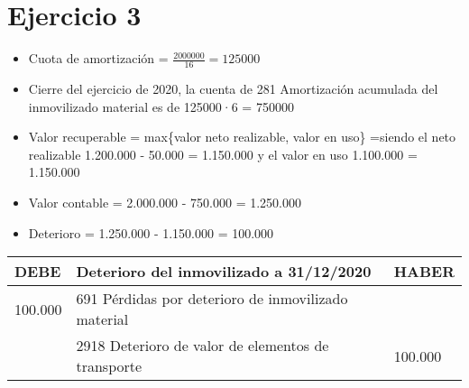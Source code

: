 \documentclass[a4paper,12pt]{article}
\newcommand{\fec}{31/12/}
\newcommand{\valorrecuperable}{Valor recuperable = max\{valor neto realizable, valor en uso\} =}
\newcommand{\PDI}{691 Pérdidas por deterioro de inmovilizado material}
\newcommand{\VC}{Valor contable = }
\begin{document}
\section{Ejercicio 3}

\begin{itemize}
    \item Cuota de amortización = $\frac{2000000}{16} = 125000$
    \item Cierre del ejercicio de 2020, la cuenta de 281 Amortización acumulada del inmovilizado material es de 125000·6 = 750000
    \item \valorrecuperable siendo el neto realizable 1.200.000 - 50.000 = 1.150.000 y el valor en uso 1.100.000 = 1.150.000
    \item \VC 2.000.000 - 750.000 = 1.250.000
    \item Deterioro = 1.250.000 - 1.150.000 = 100.000
\end{itemize}

\begin{table}[H]
    \centering
    \begin{tabular}{|p{3cm}|p{6cm}|p{3cm}|}
    \hline
    \textbf{DEBE} & \textbf{Deterioro del inmovilizado a \fec2020} & \textbf{HABER} \\
    \hline
    100.000& \PDI & \\
    \hline
    & 2918 Deterioro de valor de elementos de transporte & 100.000\\
    \hline
    \end{tabular}
\end{table}
\end{document}
